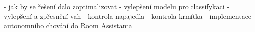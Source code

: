 - jak by se řešení dalo zoptimalizovat\newline
- vylepšení modelu pro classifykaci\newline
- vylepšení a zpřesnění vah\newline
- kontrola napajedla\newline
- kontrola krmítka\newline
- implementace autonomního chování do Room Assistanta\newline
\newline
